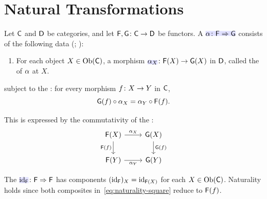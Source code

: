 \documentclass[../preamble]{subfiles}
\begin{document}
\section{Natural Transformations}
\label{sec:natural-transformation}

Let $\mathsf{C}$ and $\mathsf{D}$ be categories,
and let $\Functor{F}, \Functor{G} \colon \Category{C} \lto \Category{D}$ be functors.
A 
$\newmath{\NatTrans{\alpha} \colon \Functor{F} \Rightarrow \Functor{G}}$
consists of the following data
(; ):
\begin{enumerate}
  \item For each object $X \in \operatorname{Ob}(\mathsf{C})$,
    a morphism $\newmath{\NatTrans{\alpha}_X} \colon \Functor{F}(X) \lto \Functor{G}(X)$
    in $\mathsf{D}$,
    called the  of $\mathsf{\alpha}$ at $X$.
\end{enumerate}

subject to the :
for every morphism $f \colon X \lto Y$ in $\mathsf{C}$,
\begin{equation}
  \label{eq:naturality}
  \mathsf{G}(f) \circ \mathsf{\alpha}_X = \mathsf{\alpha}_Y \circ \mathsf{F}(f).
\end{equation}

This is expressed by the commutativity of the :
\begin{equation}
  \label{eq:naturality-square}
  \begin{tikzcd}
    \Functor{F}(X) \arrow[r, "\NatTrans{\alpha}_X"] \arrow[d, "\Functor{F}(f)"']
      & \Functor{G}(X) \arrow[d, "\Functor{G}(f)"] \\
    \Functor{F}(Y) \arrow[r, "\NatTrans{\alpha}_Y"']
      & \Functor{G}(Y)
  \end{tikzcd}
\end{equation}

\begin{definition}
  \label{def:id-nat-trans}
  The 
  $\newmath{\id_{\Functor{F}}} \colon \Functor{F} \Rightarrow \Functor{F}$
  has components $(\operatorname{id}_{\mathsf{F}})_X = \operatorname{id}_{\mathsf{F}(X)}$
  for each $X \in \operatorname{Ob}(\mathsf{C})$.
  Naturality holds since both composites in~\eqref{eq:naturality-square}
  reduce to $\mathsf{F}(f)$.
\end{definition}
\end{document}

